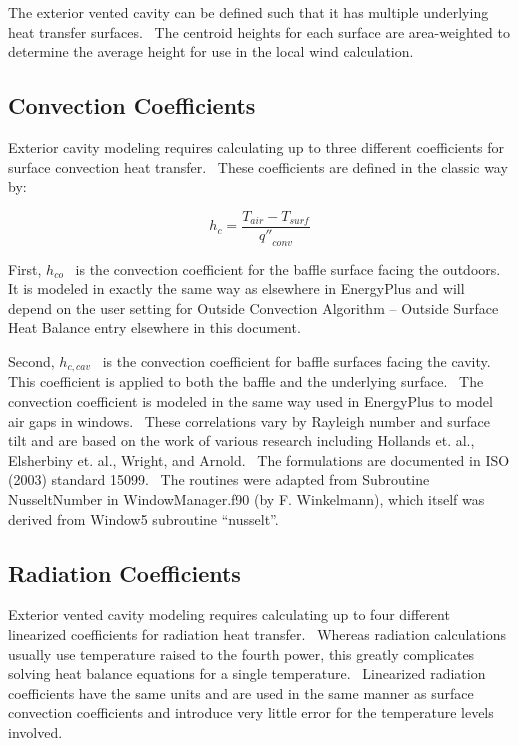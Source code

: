 The exterior vented cavity can be defined such that it has multiple underlying heat transfer surfaces.~ The centroid heights for each surface are area-weighted to determine the average height for use in the local wind calculation.

\subsection{Convection Coefficients}\label{convection-coefficients}

Exterior cavity modeling requires calculating up to three different coefficients for surface convection heat transfer.~ These coefficients are defined in the classic way by:

\begin{equation}
{h_c} = \frac{{{T_{air}} - {T_{surf}}}}{{{{q''}_{conv}}}}
\end{equation}

First, \({h_{co}}\) ~is the convection coefficient for the baffle surface facing the outdoors.~ It is modeled in exactly the same way as elsewhere in EnergyPlus and will depend on the user setting for Outside Convection Algorithm -- Outside Surface Heat Balance entry elsewhere in this document.

Second, \({h_{c,cav}}\) ~is the convection coefficient for baffle surfaces facing the cavity.~ This coefficient is applied to both the baffle and the underlying surface.~ The convection coefficient is modeled in the same way used in EnergyPlus to model air gaps in windows.~ These correlations vary by Rayleigh number and surface tilt and are based on the work of various research including Hollands et. al., Elsherbiny et. al., Wright, and Arnold.~ The formulations are documented in ISO (2003) standard 15099.~ The routines were adapted from Subroutine NusseltNumber in WindowManager.f90 (by F. Winkelmann), which itself was derived from Window5 subroutine ``nusselt''.

\subsection{Radiation Coefficients}\label{radiation-coefficients}

Exterior vented cavity modeling requires calculating up to four different linearized coefficients for radiation heat transfer.~ Whereas radiation calculations usually use temperature raised to the fourth power, this greatly complicates solving heat balance equations for a single temperature.~ Linearized radiation coefficients have the same units and are used in the same manner as surface convection coefficients and introduce very little error for the temperature levels involved.

